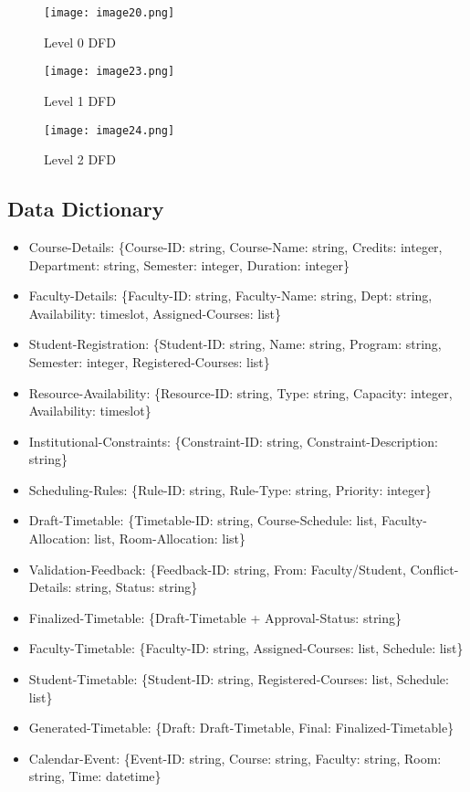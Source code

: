 \documentclass[12pt]{article}
\begin{document}
\begin{figure}[H]
    \centering
    \texttt{[image: image20.png]}
    \caption{Level 0 DFD}
    \label{fig:placeholder}
\end{figure}
\begin{figure}[H]
    \centering
    \texttt{[image: image23.png]}
    \caption{Level 1 DFD}
    \label{fig:placeholder}
\end{figure}
\begin{figure}[H]
    \centering
    \texttt{[image: image24.png]}
    \caption{Level 2 DFD}
    \label{fig:placeholder}
\end{figure}
\subsection{Data Dictionary}

\begin{itemize}
    \item Course-Details: \{Course-ID: string, Course-Name: string, Credits: integer, Department: string, Semester: integer, Duration: integer\}
    \item Faculty-Details: \{Faculty-ID: string, Faculty-Name: string, Dept: string, Availability: timeslot, Assigned-Courses: list\}
    \item Student-Registration: \{Student-ID: string, Name: string, Program: string, Semester: integer, Registered-Courses: list\}
    \item Resource-Availability: \{Resource-ID: string, Type: string, Capacity: integer, Availability: timeslot\}

    \item Institutional-Constraints: \{Constraint-ID: string, Constraint-Description: string\}

    \item Scheduling-Rules: \{Rule-ID: string, Rule-Type: string, Priority: integer\}

    \item Draft-Timetable: \{Timetable-ID: string, Course-Schedule: list, Faculty-Allocation: list, Room-Allocation: list\}

    \item Validation-Feedback: \{Feedback-ID: string, From: Faculty/Student, Conflict-Details: string, Status: string\}
 
    \item Finalized-Timetable: \{Draft-Timetable + {Approval-Status: string}\}

    \item Faculty-Timetable: \{Faculty-ID: string, Assigned-Courses: list, Schedule: list\}

    \item Student-Timetable: \{Student-ID: string, Registered-Courses: list, Schedule: list\}

    \item Generated-Timetable: \{Draft: Draft-Timetable, Final: Finalized-Timetable\}

    \item Calendar-Event: \{Event-ID: string, Course: string, Faculty: string, Room: string, Time: datetime\}
\end{itemize}
\newpage
\end{document}

